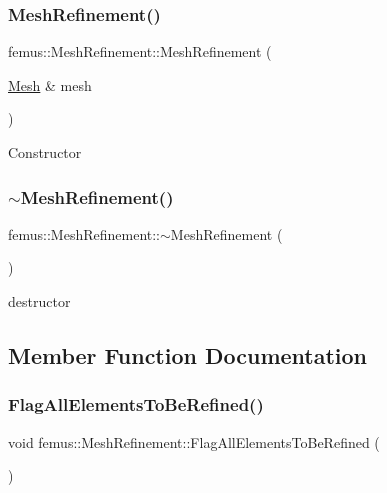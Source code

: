 \subsubsection{\texorpdfstring{Mesh\+Refinement()}{MeshRefinement()}}
{\footnotesize\ttfamily femus\+::\+Mesh\+Refinement\+::\+Mesh\+Refinement (\begin{DoxyParamCaption}\item[{\mbox{\hyperlink{classfemus_1_1_mesh}{Mesh}} \&}]{mesh }\end{DoxyParamCaption})}

Constructor \mbox{\label{classfemus_1_1_mesh_refinement_ad3738fdea7f3bed9ea1ebae5e793a756}} 
\subsubsection{\texorpdfstring{$\sim$\+Mesh\+Refinement()}{~MeshRefinement()}}
{\footnotesize\ttfamily femus\+::\+Mesh\+Refinement\+::$\sim$\+Mesh\+Refinement (\begin{DoxyParamCaption}{ }\end{DoxyParamCaption})}

destructor 

\subsection{Member Function Documentation}
\mbox{\label{classfemus_1_1_mesh_refinement_a64eff6dfcba6642eeccc684446d7763b}} 
\subsubsection{\texorpdfstring{Flag\+All\+Elements\+To\+Be\+Refined()}{FlagAllElementsToBeRefined()}}
{\footnotesize\ttfamily void femus\+::\+Mesh\+Refinement\+::\+Flag\+All\+Elements\+To\+Be\+Refined (\begin{DoxyParamCaption}{ }\end{DoxyParamCaption})}

